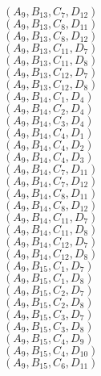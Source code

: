 \documentclass[14pt]{article}
\begin{document}
    $({A}_{9}, {B}_{13}, {C}_{7}, {D}_{12}) $ \\ 
    $({A}_{9}, {B}_{13}, {C}_{8}, {D}_{11}) $ \\ 
    $({A}_{9}, {B}_{13}, {C}_{8}, {D}_{12}) $ \\ 
    $({A}_{9}, {B}_{13}, {C}_{11}, {D}_{7}) $ \\ 
    $({A}_{9}, {B}_{13}, {C}_{11}, {D}_{8}) $ \\ 
    $({A}_{9}, {B}_{13}, {C}_{12}, {D}_{7}) $ \\ 
    $({A}_{9}, {B}_{13}, {C}_{12}, {D}_{8}) $ \\ 
    $({A}_{9}, {B}_{14}, {C}_{1}, {D}_{4}) $ \\ 
    $({A}_{9}, {B}_{14}, {C}_{2}, {D}_{4}) $ \\ 
    $({A}_{9}, {B}_{14}, {C}_{3}, {D}_{4}) $ \\ 
    $({A}_{9}, {B}_{14}, {C}_{4}, {D}_{1}) $ \\ 
    $({A}_{9}, {B}_{14}, {C}_{4}, {D}_{2}) $ \\ 
    $({A}_{9}, {B}_{14}, {C}_{4}, {D}_{3}) $ \\ 
    $({A}_{9}, {B}_{14}, {C}_{7}, {D}_{11}) $ \\ 
    $({A}_{9}, {B}_{14}, {C}_{7}, {D}_{12}) $ \\ 
    $({A}_{9}, {B}_{14}, {C}_{8}, {D}_{11}) $ \\ 
    $({A}_{9}, {B}_{14}, {C}_{8}, {D}_{12}) $ \\ 
    $({A}_{9}, {B}_{14}, {C}_{11}, {D}_{7}) $ \\ 
    $({A}_{9}, {B}_{14}, {C}_{11}, {D}_{8}) $ \\ 
    $({A}_{9}, {B}_{14}, {C}_{12}, {D}_{7}) $ \\ 
    $({A}_{9}, {B}_{14}, {C}_{12}, {D}_{8}) $ \\ 
    $({A}_{9}, {B}_{15}, {C}_{1}, {D}_{7}) $ \\ 
    $({A}_{9}, {B}_{15}, {C}_{1}, {D}_{8}) $ \\ 
    $({A}_{9}, {B}_{15}, {C}_{2}, {D}_{7}) $ \\ 
    $({A}_{9}, {B}_{15}, {C}_{2}, {D}_{8}) $ \\ 
    $({A}_{9}, {B}_{15}, {C}_{3}, {D}_{7}) $ \\ 
    $({A}_{9}, {B}_{15}, {C}_{3}, {D}_{8}) $ \\ 
    $({A}_{9}, {B}_{15}, {C}_{4}, {D}_{9}) $ \\ 
    $({A}_{9}, {B}_{15}, {C}_{4}, {D}_{10}) $ \\ 
    $({A}_{9}, {B}_{15}, {C}_{6}, {D}_{11}) $ \\ 
\end{document}
